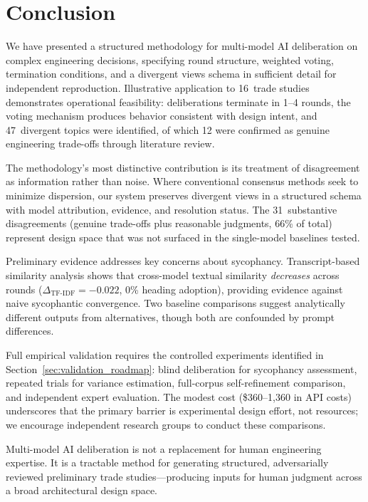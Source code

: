 \documentclass[11pt,a4paper]{article}
\begin{document}
\section{Conclusion}
\label{sec:conclusion}

We have presented a structured methodology for multi-model AI deliberation on complex engineering decisions, specifying round structure, weighted voting, termination conditions, and a divergent views schema in sufficient detail for independent reproduction. Illustrative application to 16~trade studies demonstrates operational feasibility: deliberations terminate in 1--4 rounds, the voting mechanism produces behavior consistent with design intent, and 47~divergent topics were identified, of which 12 were confirmed as genuine engineering trade-offs through literature review.

The methodology's most distinctive contribution is its treatment of disagreement as information rather than noise. Where conventional consensus methods seek to minimize dispersion, our system preserves divergent views in a structured schema with model attribution, evidence, and resolution status. The 31~substantive disagreements (genuine trade-offs plus reasonable judgments, 66\% of total) represent design space that was not surfaced in the single-model baselines tested.

Preliminary evidence addresses key concerns about sycophancy. Transcript-based similarity analysis shows that cross-model textual similarity \emph{decreases} across rounds ($\Delta_{\text{TF-IDF}} = -0.022$, 0\% heading adoption), providing evidence against naive sycophantic convergence. Two baseline comparisons suggest analytically different outputs from alternatives, though both are confounded by prompt differences.

Full empirical validation requires the controlled experiments identified in Section~\ref{sec:validation_roadmap}: blind deliberation for sycophancy assessment, repeated trials for variance estimation, full-corpus self-refinement comparison, and independent expert evaluation. The modest cost (\$360--1{,}360 in API costs) underscores that the primary barrier is experimental design effort, not resources; we encourage independent research groups to conduct these comparisons.

Multi-model AI deliberation is not a replacement for human engineering expertise. It is a tractable method for generating structured, adversarially reviewed preliminary trade studies---producing inputs for human judgment across a broad architectural design space.
\end{document}
